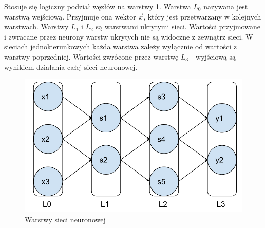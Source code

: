 \documentclass[a4paper,12pt,twoside,openany]{report}
\begin{document}
\begin{enumerate}
Stosuje się logiczny podział węzłów na warstwy \ref{rys:mlp:warstwy}.
Warstwa $L_0$ nazywana jest warstwą wejściową.
Przyjmuje ona wektor $\vec x$, który jest przetwarzany w kolejnych warstwach.
Warstwy $L_1$ i $L_2$ są warstwami ukrytymi sieci. 
Wartości przyjmowane i zwracane przez neurony warstw ukrytych nie są widoczne z zewnątrz sieci.
W sieciach jednokierunkowych każda warstwa zależy wyłącznie od wartości z warstwy poprzedniej.
Wartości zwrócone przez warstwę $L_3$ - wyjściową są wynikiem działania całej sieci neuronowej.
\begin{figure}[h]
	\centering
	\includegraphics[width=\textwidth]{ann-warstwy}
	\caption{Warstwy sieci neuronowej}
	\label{rys:mlp:warstwy}
\end{figure}

\end{enumerate}
\end{document}

